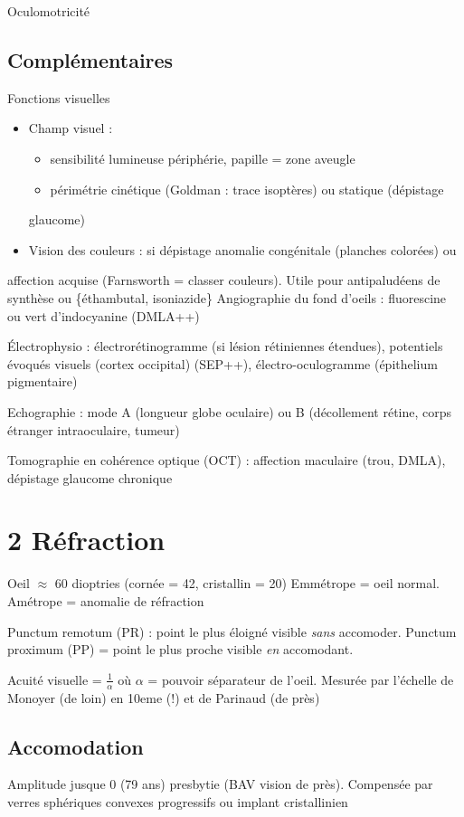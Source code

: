 \documentclass[11pt]{article}
\begin{document}
Oculomotricité

\subsection{Complémentaires}
\label{sec:org087d34f}
Fonctions visuelles
\begin{itemize}
\item Champ visuel :
\begin{itemize}
\item sensibilité lumineuse \dec périphérie, papille = zone aveugle
\item périmétrie cinétique (Goldman : trace isoptères) ou statique (dépistage
\end{itemize}
glaucome)
\item Vision des couleurs : si dépistage anomalie congénitale (planches colorées) ou
\end{itemize}
affection acquise (Farnsworth = classer couleurs). Utile pour antipaludéens de
synthèse ou \{éthambutal, isoniazide\}
Angiographie du fond d'oeils : fluorescine ou vert d'indocyanine (DMLA++)

Électrophysio : électrorétinogramme (si lésion rétiniennes étendues), potentiels
évoqués visuels (cortex occipital) (SEP++), électro-oculogramme (épithelium pigmentaire)

Echographie : mode A (longueur globe oculaire) ou B (décollement rétine, corps
étranger intraoculaire, tumeur)

Tomographie en cohérence optique (OCT) : affection maculaire (trou, DMLA),
dépistage glaucome chronique

\section{2 Réfraction}
\label{sec:org2120090}
Oeil \(\approx\) 60 dioptries (cornée = 42, cristallin = 20)
Emmétrope = oeil normal. Amétrope = anomalie de réfraction

Punctum remotum (PR) : point le plus éloigné visible \emph{sans} accomoder. Punctum
proximum (PP) = point le plus proche visible \emph{en} accomodant.

Acuité visuelle = \(\frac{1}{\alpha}\) où \(\alpha\) = pouvoir séparateur de
l'oeil. Mesurée par l'échelle de Monoyer (de loin) en 10eme (!) et de Parinaud
(de près)

\subsection{Accomodation}
\label{sec:org73e6e8d}
Amplitude \dec jusque 0 (79 ans) \thus presbytie (BAV vision de près). Compensée
par verres sphériques convexes progressifs ou implant cristallinien
\end{document}
